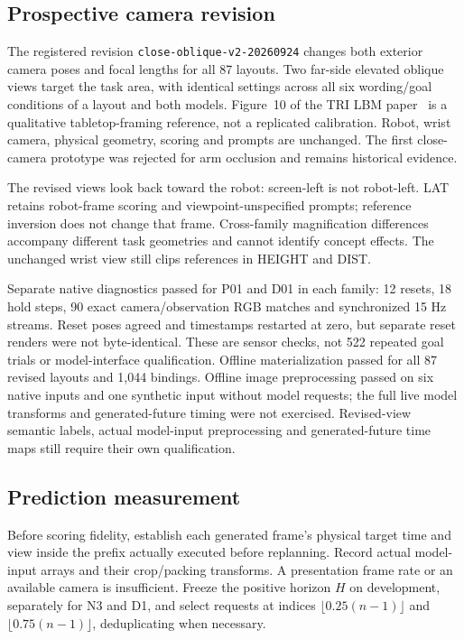 \subsection{Prospective camera revision}
The registered revision \texttt{close-oblique-v2-20260924} changes both exterior camera poses and focal lengths for all 87 layouts. Two far-side elevated oblique views target the task area, with identical settings across all six wording/goal conditions of a layout and both models. Figure~10 of the TRI LBM paper~\cite{trilbm} is a qualitative tabletop-framing reference, not a replicated calibration. Robot, wrist camera, physical geometry, scoring and prompts are unchanged. The first close-camera prototype was rejected for arm occlusion and remains historical evidence.

The revised views look back toward the robot: screen-left is not robot-left. LAT retains robot-frame scoring and viewpoint-unspecified prompts; reference inversion does not change that frame. Cross-family magnification differences accompany different task geometries and cannot identify concept effects. The unchanged wrist view still clips references in HEIGHT and DIST.

Separate native diagnostics passed for P01 and D01 in each family: 12 resets, 18 hold steps, 90 exact camera/observation RGB matches and synchronized 15 Hz streams. Reset poses agreed and timestamps restarted at zero, but separate reset renders were not byte-identical. These are sensor checks, not 522 repeated goal trials or model-interface qualification. Offline materialization passed for all 87 revised layouts and 1,044 bindings. Offline image preprocessing passed on six native inputs and one synthetic input without model requests; the full live model transforms and generated-future timing were not exercised. Revised-view semantic labels, actual model-input preprocessing and generated-future time maps still require their own qualification.

\subsection{Prediction measurement}
Before scoring fidelity, establish each generated frame's physical target time and view inside the prefix actually executed before replanning. Record actual model-input arrays and their crop/packing transforms. A presentation frame rate or an available camera is insufficient. Freeze the positive horizon $H$ on development, separately for N3 and D1, and select requests at indices $\lfloor0.25(n-1)\rfloor$ and $\lfloor0.75(n-1)\rfloor$, deduplicating when necessary.

